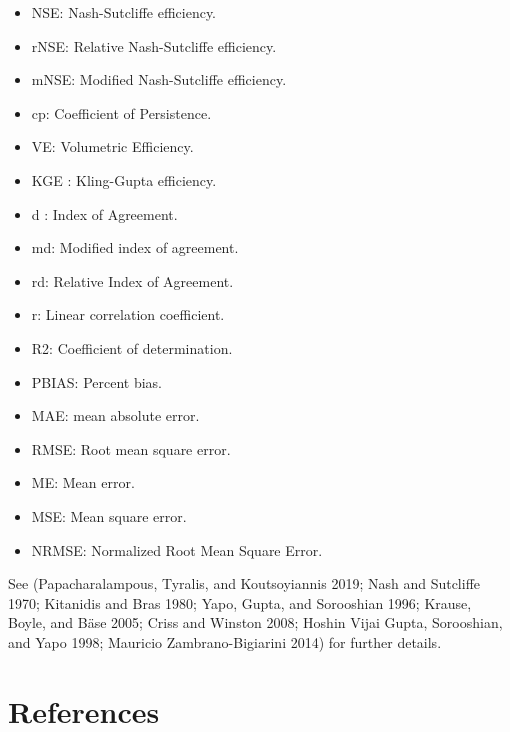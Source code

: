 \begin{itemize}
\item
  NSE: Nash-Sutcliffe efficiency.
\item
  rNSE: Relative Nash-Sutcliffe efficiency.
\item
  mNSE: Modified Nash-Sutcliffe efficiency.
\item
  cp: Coefficient of Persistence.
\item
  VE: Volumetric Efficiency.
\item
  KGE : Kling-Gupta efficiency.
\item
  d : Index of Agreement.
\item
  md: Modified index of agreement.
\item
  rd: Relative Index of Agreement.
\item
  r: Linear correlation coefficient.
\item
  R2: Coefficient of determination.
\item
  PBIAS: Percent bias.
\item
  MAE: mean absolute error.
\item
  RMSE: Root mean square error.
\item
  ME: Mean error.
\item
  MSE: Mean square error.
\item
  NRMSE: Normalized Root Mean Square Error.
\end{itemize}

See (Papacharalampous, Tyralis, and Koutsoyiannis 2019; Nash and Sutcliffe 1970; Kitanidis and Bras 1980; Yapo, Gupta, and Sorooshian 1996; Krause, Boyle, and Bäse 2005; Criss and Winston 2008; Hoshin Vijai Gupta, Sorooshian, and Yapo 1998; Mauricio Zambrano-Bigiarini 2014) for further details.

\hypertarget{references}{%
\section*{References}\label{references}}

